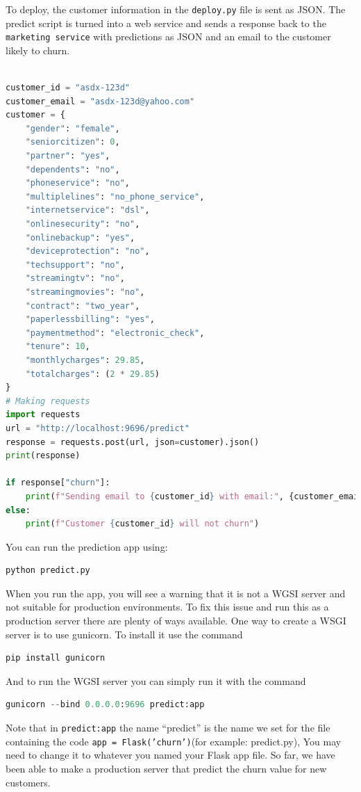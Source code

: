 \documentclass[letterpaper,12pt,notitlepage,twoside]{report}
\begin{document}
To deploy,  the customer information in the \texttt{deploy.py} file is sent as JSON. The predict script is turned into a web service and sends a response back to the \texttt{marketing service} with predictions as JSON and an email to the customer likely to churn.
\begin{lstlisting}[language=python, numbers=none]

customer_id = "asdx-123d"
customer_email = "asdx-123d@yahoo.com"
customer = {
    "gender": "female",
    "seniorcitizen": 0,
    "partner": "yes",
    "dependents": "no",
    "phoneservice": "no",
    "multiplelines": "no_phone_service",
    "internetservice": "dsl",
    "onlinesecurity": "no",
    "onlinebackup": "yes",
    "deviceprotection": "no",
    "techsupport": "no",
    "streamingtv": "no",
    "streamingmovies": "no",
    "contract": "two_year",
    "paperlessbilling": "yes",
    "paymentmethod": "electronic_check",
    "tenure": 10,
    "monthlycharges": 29.85,
    "totalcharges": (2 * 29.85)
}
# Making requests
import requests
url = "http://localhost:9696/predict"
response = requests.post(url, json=customer).json()
print(response)

if response["churn"]:
    print(f"Sending email to {customer_id} with email:", {customer_email})
else:
    print(f"Customer {customer_id} will not churn")
\end{lstlisting}

You can run the prediction app using:
\begin{lstlisting}[language=python, numbers=none]
python predict.py
\end{lstlisting}
When you run the app, you will see a warning that it is not a WGSI server and not suitable for production environments. To fix this issue and run this as a production server there are plenty of ways available. One way to create a WSGI server is to use gunicorn. To install it use the command 
\begin{lstlisting}[language=python, numbers=none]
pip install gunicorn
\end{lstlisting}
And to run the WGSI server you can simply run it with the command 
\begin{lstlisting}[language=python, numbers=none]
gunicorn --bind 0.0.0.0:9696 predict:app 
\end{lstlisting}

Note that in \texttt{predict:app} the name ``predict'' is the name we set for the file containing the code \texttt{app = Flask('churn')}(for example: predict.py), You may need to change it to whatever you named your Flask app file. So far, we have been able to make a production server that predict the churn value for new customers.
\end{document}
